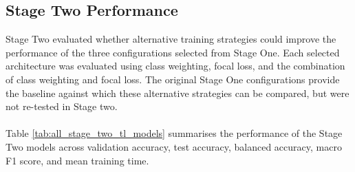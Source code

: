 \documentclass[12pt, a4paper]{report}
\let\oldsubsection\subsection
\renewcommand{\subsection}{%
    \Needspace{6\baselineskip}%
    \oldsubsection
}
\begin{document}
			\subsection{Stage Two Performance}
				
				Stage Two evaluated whether alternative training strategies could improve the performance of the three configurations selected from Stage One. Each selected architecture was evaluated using class weighting, focal loss, and the combination of class weighting and focal loss. The original Stage One configurations provide the baseline against which these alternative strategies can be compared, but were not re-tested in Stage two.\\\\
				Table \ref{tab:all_stage_two_tl_models} summarises the performance of the Stage Two models across validation accuracy, test accuracy, balanced accuracy, macro F1 score, and mean training time.
				\newpage
				\setlength{\tabcolsep}{2pt}
\end{document}
